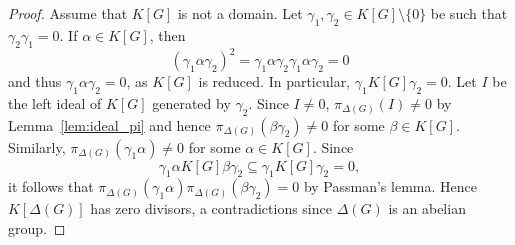 \begin{proof}
	Assume that $K[G]$ is not a domain. Let $\gamma_1,\gamma_2\in K[G]\setminus\{0\}$
	be such that $\gamma_2\gamma_1=0$. If $\alpha\in K[G]$, then
	\[
		(\gamma_1\alpha\gamma_2)^2=\gamma_1\alpha\gamma_2\gamma_1\alpha\gamma_2=0
	\]
	and thus $\gamma_1\alpha\gamma_2=0$, as $K[G]$ is reduced. In particular, 
	$\gamma_1K[G]\gamma_2=0$. Let $I$ be the left ideal of $K[G]$ generated 
	by $\gamma_2$. Since $I\ne 0$, $\pi_{\Delta(G)}(I)\ne 0$ by Lemma~\ref{lem:ideal_pi}
	and hence  $\pi_{\Delta(G)}(\beta\gamma_2)\ne 0$ for some $\beta\in K[G]$. 
	Similarly, 
	$\pi_{\Delta(G)}(\gamma_1\alpha)\ne 0$ for some $\alpha\in K[G]$. Since 
	\[
		\gamma_1\alpha K[G]\beta\gamma_2\subseteq \gamma_1 K[G]\gamma_2=0,
	\]
    it follows that $\pi_{\Delta(G)}(\gamma_1\alpha)\pi_{\Delta(G)}(\beta\gamma_2)=0$
    by Passman's lemma. Hence $K[\Delta(G)]$ has zero divisors, a contradictions
    since $\Delta(G)$ is an abelian group.
\end{proof}

